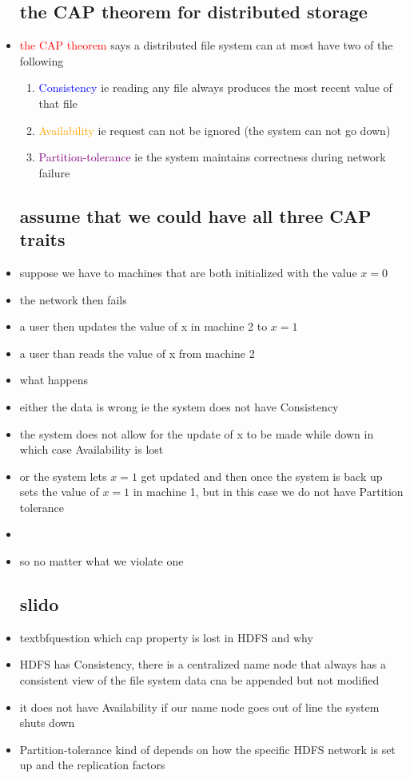 \documentclass{article}
\begin{document}
\begin{itemize}
\subsection*{the CAP theorem for distributed storage}
\item \textcolor{red}{the CAP theorem } says a distributed file system can at most have two of the following
\begin{enumerate}
    \item \textcolor{blue}{Consistency} ie reading any file always produces the most recent value of that file 
    \item \textcolor{orange}{Availability} ie request can not be ignored (the system can not go down)
    \item \textcolor{purple}{Partition-tolerance} ie the system maintains correctness during network failure 
\end{enumerate}
\subsection*{assume that we could have all three CAP traits}
\item suppose we have to machines that are both initialized with the value $x=0$
\item the network then fails 
\item a user then updates the value of x in machine 2 to $x=1$
\item a user than reads the value of x from machine 2
\item what happens
\item either the data is wrong ie the system does not have Consistency
\item the system does not allow for the update of x to be made while down in which case Availability is lost
\item or the system lets $x=1$ get updated and then once the system is back up sets the value of $x=1$ in machine 1, but in this case we do not have Partition tolerance
\item \item so no matter what we violate one 
\subsection*{slido}
\item textbf{question} which cap property is lost in HDFS and why 
\item HDFS has Consistency, there is a centralized name node that always has a consistent view of the file system data cna be appended but not modified
\item it does not have Availability if our name node goes out of line the system shuts down 
\item Partition-tolerance kind of depends on how the specific HDFS network is set up and the replication factors

\end{itemize}
\end{document}
